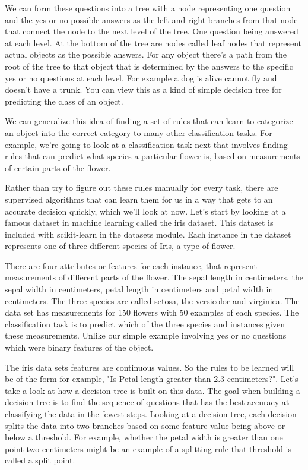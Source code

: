 \begin{multicols}{2}
We can form these questions into a tree with a node representing one question and the yes or no possible answers as the left and right branches from that node that connect the node to the next level of the tree. One question being answered at each level. At the bottom of the tree are nodes called leaf nodes that represent actual objects as the possible answers. For any object there's a path from the root of the tree to that object that is determined by the answers to the specific yes or no questions at each level. For example a dog is alive cannot fly and doesn't have a trunk. You can view this as a kind of simple decision tree for predicting the class of an object. 

We can generalize this idea of finding a set of rules that can learn to categorize an object into the correct category to many other classification tasks. For example, we're going to look at a classification task next that involves finding rules that can predict what species a particular flower is, based on measurements of certain parts of the flower. 

Rather than try to figure out these rules manually for every task, there are supervised algorithms that can learn them for us in a way that gets to an accurate decision quickly, which we'll look at now. Let's start by looking at a famous dataset in machine learning called the iris dataset. This dataset is included with scikit-learn in the datasets module. Each instance in the dataset represents one of three different species of Iris, a type of flower. 

There are four attributes or features for each instance, that represent measurements of different parts of the flower. The sepal length in centimeters, the sepal width in centimeters, petal length in centimeters and petal width in centimeters. The three species are called setosa, the versicolor and virginica. The data set has measurements for 150 flowers with 50 examples of each species. The classification task is to predict which of the three species and instances given these measurements. Unlike our simple example involving yes or no questions which were binary features of the object. 

The iris data sets features are continuous values. So the rules to be learned will be of the form for example, "Is Petal length greater than 2.3 centimeters?". Let's take a look at how a decision tree is built on this data. The goal when building a decision tree is to find the sequence of questions that has the best accuracy at classifying the data in the fewest steps. Looking at a decision tree, each decision splits the data into two branches based on some feature value being above or below a threshold. For example, whether the petal width is greater than one point two centimeters might be an example of a splitting rule that threshold is called a split point. 


\end{multicols}
